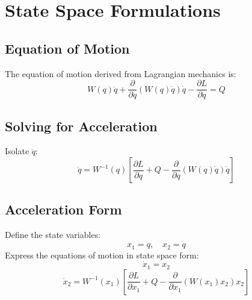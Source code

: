 \section{State Space Formulations}

\subsection{Equation of Motion}
The equation of motion derived from Lagrangian mechanics is:
\[
W(q) \ddot{q} + \frac{\partial}{\partial q} (W(q) \dot{q}) \dot{q} - \frac{\partial L}{\partial q} = Q
\]


\subsection{Solving for Acceleration}
Isolate \(\ddot{q}\):
\[
\ddot{q} = W^{-1}(q) \left[ \frac{\partial L}{\partial q} + Q - \frac{\partial}{\partial q} (W(q) \dot{q}) \dot{q} \right]
\]

\subsection{Acceleration Form}
Define the state variables:
\[
x_1 = q, \quad x_2 = \dot{q}
\]
Express the equations of motion in state space form:
\[
\dot{x}_1 = x_2
\]
\[
\dot{x}_2 = W^{-1}(x_1) \left[ \frac{\partial L}{\partial x_1} + Q - \frac{\partial}{\partial x_1} (W(x_1) x_2) x_2 \right]
\]

